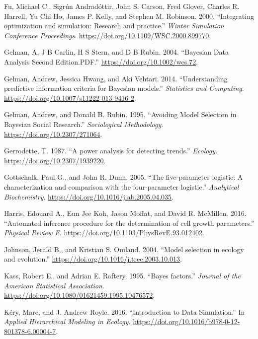 \documentclass[12pt,]{article}
\begin{document}
\leavevmode\hypertarget{ref-Fu2000}{}%
Fu, Michael C., Sigrún Andradóttir, John S. Carson, Fred Glover, Charles R. Harrell, Yu Chi Ho, James P. Kelly, and Stephen M. Robinson. 2000. ``Integrating optimization and simulation: Research and practice.'' \emph{Winter Simulation Conference Proceedings}. \url{https://doi.org/10.1109/WSC.2000.899770}.

\leavevmode\hypertarget{ref-Gelman2004}{}%
Gelman, A, J B Carlin, H S Stern, and D B Rubin. 2004. ``Bayesian Data Analysis Second Edition.PDF.'' \url{https://doi.org/10.1002/wcs.72}.

\leavevmode\hypertarget{ref-Gelman2014}{}%
Gelman, Andrew, Jessica Hwang, and Aki Vehtari. 2014. ``Understanding predictive information criteria for Bayesian models.'' \emph{Statistics and Computing}. \url{https://doi.org/10.1007/s11222-013-9416-2}.

\leavevmode\hypertarget{ref-Gelman1995}{}%
Gelman, Andrew, and Donald B. Rubin. 1995. ``Avoiding Model Selection in Bayesian Social Research.'' \emph{Sociological Methodology}. \url{https://doi.org/10.2307/271064}.

\leavevmode\hypertarget{ref-Gerrodette1987}{}%
Gerrodette, T. 1987. ``A power analysis for detecting trends.'' \emph{Ecology}. \url{https://doi.org/10.2307/1939220}.

\leavevmode\hypertarget{ref-Gottschalk2005}{}%
Gottschalk, Paul G., and John R. Dunn. 2005. ``The five-parameter logistic: A characterization and comparison with the four-parameter logistic.'' \emph{Analytical Biochemistry}. \url{https://doi.org/10.1016/j.ab.2005.04.035}.

\leavevmode\hypertarget{ref-Harris2016}{}%
Harris, Edouard A., Eun Jee Koh, Jason Moffat, and David R. McMillen. 2016. ``Automated inference procedure for the determination of cell growth parameters.'' \emph{Physical Review E}. \url{https://doi.org/10.1103/PhysRevE.93.012402}.

\leavevmode\hypertarget{ref-Johnson2004}{}%
Johnson, Jerald B., and Kristian S. Omland. 2004. ``Model selection in ecology and evolution.'' \url{https://doi.org/10.1016/j.tree.2003.10.013}.

\leavevmode\hypertarget{ref-Kass1995}{}%
Kass, Robert E., and Adrian E. Raftery. 1995. ``Bayes factors.'' \emph{Journal of the American Statistical Association}. \url{https://doi.org/10.1080/01621459.1995.10476572}.

\leavevmode\hypertarget{ref-Kery2016}{}%
Kéry, Marc, and J. Andrew Royle. 2016. ``Introduction to Data Simulation.'' In \emph{Applied Hierarchical Modeling in Ecology}. \url{https://doi.org/10.1016/b978-0-12-801378-6.00004-7}.
\end{document}

